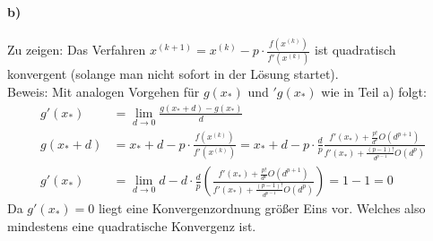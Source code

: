\paragraph*{b)}
Zu zeigen: Das Verfahren $x^{(k+1)}=x^{(k)} - p \cdot \frac{f(x^{(k)})}{f'(x^{(k)})}$ ist quadratisch konvergent (solange man nicht sofort in der Lösung startet).\\
Beweis: Mit analogen Vorgehen für $g(x_*)$ und $'g(x_*)$ wie in Teil a) folgt:
\begin{align*}
g'(x_*) &= \lim\limits_{d \rightarrow 0} \frac{g(x_*+d)-g(x_*)}{d}\\
g(x_*+d) &= x_* + d - p \cdot \frac{f(x^{(k)})}{f'(x^{(k)})} = x_*+d-p\cdot \frac{d}{p}\frac{f'(x_*) + \frac{p!}{d^p}O(d^{p+1})}{f'(x_*) + \frac{(p-1)!}{d^{p-1}}O(d^{p})}\\
g'(x_*) &= \lim\limits_{d \rightarrow 0} d-d \cdot \frac{d}{p}\left(\frac{f'(x_*) + \frac{p!}{d^p}O(d^{p+1})}{f'(x_*) + \frac{(p-1)!}{d^{p-1}}O(d^{p})} \right) = 1-1 = 0
\end{align*}
Da $g'(x_*) = 0$ liegt eine Konvergenzordnung größer Eins vor. Welches also mindestens eine quadratische Konvergenz ist.
